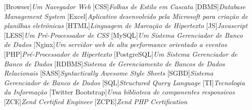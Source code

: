 
[Browser]{\textit{Um Navegador Web}}
[CSS]{\textit{Folhas de Estilo em Cascata}}
[DBMS]{\textit{Database Management System}}
[Excel]{\textit{Aplicativo desenvolvido pela Microsoft para
criação de planilhas eletrônicas}}
[HTML]{\textit{Linguagem de Marcação de Hipertexto}}
[JS]{\textit{Javascript}}
[LESS]{\textit{Um Pré-Processador de CSS}}
[MySQL]{\textit{Um Sistema Gerenciador de Banco de Dados}}
[Nginx]{\textit{Um servidor web de alta performance orientado a
eventos}}
[PHP]{\textit{Pré-Processador de Hipertexto}}
[PostgreSQL]{\textit{Um Sistema Gerenciador de Banco de Dados}}
[RDBMS]{\textit{Sistema de Gerenciamento de Bancos de Dados
Relacionais}}
[SASS]{\textit{Syntactically Awesome Style Sheets}}
[SGBD]{\textit{Sistema Gerenciador de Banco de Dados}}
[SQL]{\textit{Structured Query Language}}
[TI]{\textit{Tecnologia da Informação}}
[Twitter Bootstrap]{\textit{Uma biblioteca de
componentes responsivos}}
[ZCE]{\textit{Zend Certified Engineer}}
[ZCPE]{\textit{Zend PHP Certification}}